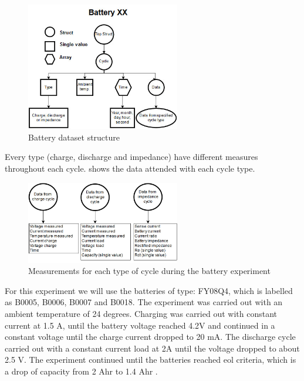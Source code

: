 \documentclass[english, a4paper]{report}
\begin{document}
{{{            \begin{figure}[H]
                \centering
                \includegraphics[width=0.6\textwidth]{BatteryDatasetStructure}
                \caption{Battery dataset structure}
                \label{fig:BatteryDatasetStructure}
            \end{figure}
        
            Every type (charge, discharge and impedance) have different measures throughout each cycle.  shows the data attended with each cycle type.
            
            \begin{figure}[H]
                \centering \includegraphics[width=0.6\textwidth]{BatteryTypeStructure}
                \caption{Measurements for each type of cycle during the battery experiment}
                \label{fig:BatteryTypeStructure}
            \end{figure}
            
            For this experiment we will use the batteries of type: FY08Q4, which is labelled as B0005, B0006, B0007 and B0018. The experiment was carried out with an ambient temperature of 24 degrees. Charging was carried out with constant current at 1.5 A, until the battery voltage reached 4.2V and continued in a constant voltage until the charge current dropped to 20 mA. The discharge cycle carried out with a constant current load at 2A until the voltage dropped to about 2.5 V. The experiment continued until the batteries reached \gls{eol} criteria, which is a drop of capacity from 2 Ahr to 1.4 Ahr \cite{nasaBatteryPrognostics}. 
        }
    }
    
}
\end{document}
